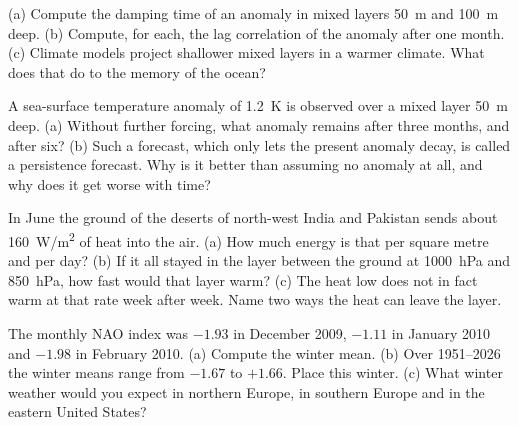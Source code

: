 \begin{exercise}[$\star\star$]\label{exo:b2:climate-variability:5}
(a) Compute the damping time of an anomaly in mixed layers \qty{50}{m} and \qty{100}{m} deep.
(b) Compute, for each, the lag correlation of the anomaly after one month. (c) Climate models
project shallower mixed layers in a warmer climate. What does that do to the memory of the
ocean?
\end{exercise}

\begin{exercise}[$\star\star$]\label{exo:b2:climate-variability:6}
A sea-surface temperature anomaly of \qty{+1.2}{K} is observed over a mixed layer \qty{50}{m}
deep. (a) Without further forcing, what anomaly remains after three months, and after six? (b)
Such a forecast, which only lets the present anomaly decay, is called a persistence forecast.
Why is it better than assuming no anomaly at all, and why does it get worse with time?
\end{exercise}

\begin{exercise}[$\star\star$]\label{exo:b2:climate-variability:7}
In June the ground of the deserts of north-west India and Pakistan sends about
\qty{160}{W/m^2} of heat into the air. (a) How much energy is that per square metre and per day?
(b) If it all stayed in the layer between the ground at \qty{1000}{hPa} and \qty{850}{hPa}, how
fast would that layer warm? (c) The heat low does not in fact warm at that rate week after week.
Name two ways the heat can leave the layer.
\end{exercise}

\begin{exercise}[$\star\star$]\label{exo:b2:climate-variability:8}
The monthly NAO index was $-1.93$ in December 2009, $-1.11$ in January 2010 and $-1.98$ in
February 2010. (a) Compute the winter mean. (b) Over 1951--2026 the winter means range from
$-1.67$ to $+1.66$. Place this winter. (c) What winter weather would you expect in northern
Europe, in southern Europe and in the eastern United States?
\end{exercise}


